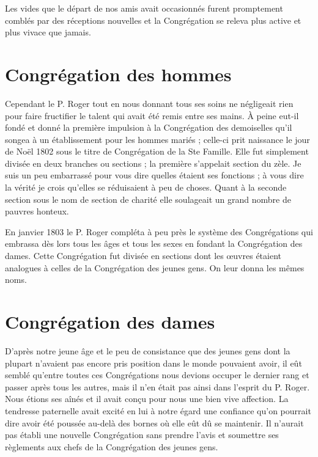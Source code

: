Les vides que le départ de nos amis avait occasionnés furent promptement comblés par des réceptions nouvelles et la Congrégation se releva plus active et plus vivace que jamais.

\section*{Congrégation des hommes}
Cependant le P. Roger tout en nous donnant tous ses soins ne négligeait rien pour faire fructifier le talent qui avait été remis entre ses mains. À peine eut-il fondé et donné la première impulsion à la Congrégation des demoiselles qu'il songea à un établissement pour les hommes mariés ; celle-ci prit naissance le jour de Noël 1802 sous le titre de Congrégation de la Ste Famille. Elle fut simplement divisée en deux branches ou sections ; la première s'appelait section du zèle. Je suis un peu embarrassé pour vous dire quelles étaient ses fonctions ; à vous dire la vérité je crois qu'elles se réduisaient à peu de choses. Quant à la seconde section sous le nom de section de charité elle soulageait un grand nombre de pauvres honteux.

En janvier 1803 le P. Roger compléta à peu près le système des Congrégations qui embrassa dès lors tous les
âges et tous les sexes en fondant la Congrégation des dames. Cette Congrégation fut divisée en sections dont les œuvres étaient analogues à celles de la Congrégation des jeunes gens. On leur donna les mêmes noms.

\section*{Congrégation des dames}
D'après notre jeune âge et le peu de consistance que des jeunes gens dont la plupart n'avaient pas encore pris position dans le monde pouvaient avoir, il eût semblé qu'entre toutes ces Congrégations nous devions occuper le dernier rang et passer après tous les autres, mais il n'en était pas ainsi dans l'esprit du P. Roger. Nous étions ses aînés et il avait conçu pour nous une bien vive affection. La tendresse paternelle avait excité en lui à notre égard une confiance qu'on pourrait dire avoir été poussée au-delà des bornes où elle eût dû se maintenir. Il n'aurait pas établi une nouvelle Congrégation sans prendre l'avis et soumettre ses règlements aux chefs de la Congrégation des jeunes gens.

